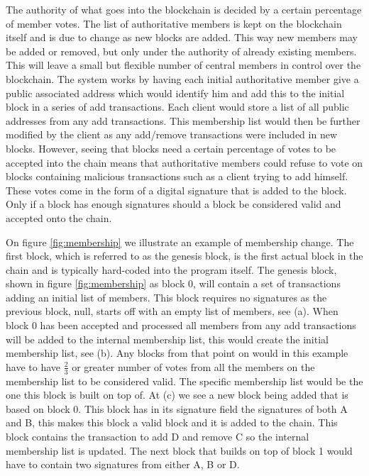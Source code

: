 \documentclass[12pt]{article}
\begin{document}
The authority of what goes into the blockchain is decided by a certain percentage of member votes. The list of authoritative members is kept on the blockchain itself and is due to change as new blocks are added. This way new members may be added or removed, but only under the authority of already existing members. This will leave a small but flexible number of central members in control over the blockchain. The system works by having each initial authoritative member give a public associated address which would identify him and add this to the initial block in a series of add transactions. Each client would store a list of all public addresses from any add transactions. This membership list would then be further modified by the client as any add/remove transactions were included in new blocks. However, seeing that blocks need a certain percentage of votes to be accepted into the chain means that authoritative members could refuse to vote on blocks containing malicious transactions such as a client trying to add himself. These votes come in the form of a digital signature that is added to the block. Only if a block has enough signatures should a block be considered valid and accepted onto the chain. 


On figure \ref{fig:membership} we illustrate an example of membership change. The first block, which is referred to as the genesis block, is the first actual block in the chain and is typically hard-coded into the program itself. The genesis block, shown in figure \ref{fig:membership} as block 0, will contain a set of transactions adding an initial list of members. This block requires no signatures as the previous block, null, starts off with an empty list of members, see (a). When block 0 has been accepted and processed all members from any add transactions will be added to the internal membership list, this would create the initial membership list, see (b). Any blocks from that point on would in this example have to have $\frac{2}{3}$ or greater number of votes from all the members on the membership list to be considered valid. The specific membership list would be the one this block is built on top of. At (c) we see a new block being added that is based on block 0. This block has in its signature field the signatures of both A and B, this makes this block a valid block and it is added to the chain. This block contains the transaction to add D and remove C so the internal membership list is updated. The next block that builds on top of block 1 would have to contain two signatures from either A, B or D.
\end{document}
